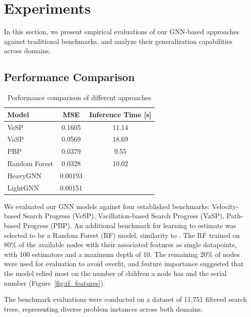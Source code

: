 \documentclass[letterpaper]{article}
\newcommand{\gur}[1]{{\color{teal}{Gur: #1}}}
\begin{document}
\section{Experiments}
In this section, we present empirical evaluations of our GNN-based approaches against traditional benchmarks, and analyze their generalization capabilities across domains.

\subsection{Performance Comparison}

\gur{Change - test, all data.}

\begin{table}[t]
    \centering
    \caption{Performance comparison of different approaches}
    \label{tab:performance}
    \begin{tabular}{|l|c|c|}
    \hline
    \textbf{Model} & \textbf{MSE} & \textbf{Inference Time [s]}\\
    \hline
    VeSP & 0.1605 & 11.14 \\
    VaSP & 0.0569 & 18.69 \\
    PBP & 0.0379 & 9.55 \\
    Random Forest & 0.0328 & 10.02 \\
    HeavyGNN & 0.00193 & \\
    LightGNN & 0.00151 & \\
    \hline
    \end{tabular}
\end{table}

\gur{Training details - train, eval, test.}

\gur{In the table report the error on the entire dataset, add a column of the test set error.}


We evaluated our GNN models against four established benchmarks: Velocity-based Search Progress (VeSP), Vacillation-based Search Progress (VaSP), Path-based Progress (PBP). An additional benchmark for learning to estimate was selected to be a Random Forest (RF) model, similarity to \citet{sudry2022learning}.
The RF trained on $80\%$ of the available nodes with their associated features as single datapoints, with 100 estimators and a maximum depth of 10. The remaining $20\%$ of nodes were used for evaluation to avoid overfit, and feature importance suggested that the model relied most on the number of children a node has and the serial number (Figure~\ref{fig:rf_features}).

The benchmark evaluations were conducted on a dataset of 11,751 filtered search trees, representing diverse problem instances across both domains. \gur{More details}
\end{document}
